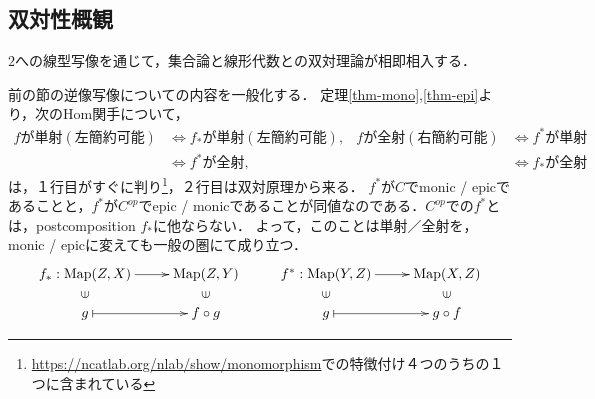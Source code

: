 \documentclass[uplatex,dvipdfmx]{jsreport}
\begin{document}
\subsection{双対性概観}

\begin{tcolorbox}[colframe=ForestGreen, colback=ForestGreen!10!white,breakable,colbacktitle=ForestGreen!40!white,coltitle=black,fonttitle=\bfseries\sffamily,
title=]
    $2$への線型写像を通じて，集合論と線形代数との双対理論が相即相入する．
\end{tcolorbox}

\begin{tcolorbox}[breakable,coltitle=white,fonttitle=\bfseries\sffamily,
    title=双対写像への全射と単射の持ち越し]
    前の節の逆像写像についての内容を一般化する．
    定理\ref{thm-mono},\ref{thm-epi}より，次のHom関手について，
    \begin{align*}
        fが単射(左簡約可能)&\Leftrightarrow f_*が単射(左簡約可能),&fが全射(右簡約可能)&\Leftrightarrow f^*が単射\\
        &\Leftrightarrow f^*が全射,&&\Leftrightarrow f_*が全射
    \end{align*}
    は，１行目がすぐに判り\footnote{\url{https://ncatlab.org/nlab/show/monomorphism}での特徴付け４つのうちの１つに含まれている}，２行目は双対原理から来る．
    $f^*$が$C$でmonic / epicであることと，$f^*$が$C^{op}$でepic / monicであることが同値なのである．$C^{op}$での$f^*$とは，postcomposition $f_*$に他ならない．
    よって，このことは単射／全射を，monic / epicに変えても一般の圏にて成り立つ．
    \[\xymatrix@R-2pc{
        f_*:\Map(Z,X)\ar[r]&\Map(Z,Y)&f^*:\Map(Y,Z)\ar[r]&\Map(X,Z)\\
        \rotatebox[origin=c]{90}{$\in$}&\rotatebox[origin=c]{90}{$\in$}&\rotatebox[origin=c]{90}{$\in$}&\rotatebox[origin=c]{90}{$\in$}\\
        g\ar@{|->}[r]&f\circ g&g\ar@{|->}[r]&g\circ f
    }\]
\end{tcolorbox}
\end{document}
